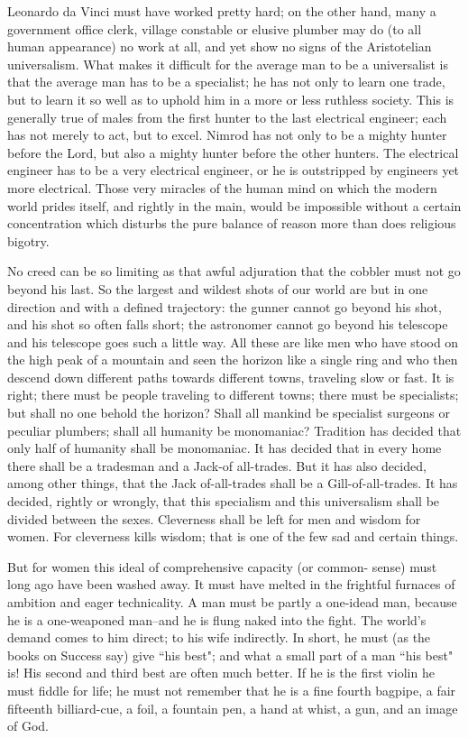 \documentclass[final,10pt,letterpaper,twocolumn,openany]{book}
\begin{document}
Leonardo da Vinci must have worked pretty hard;
on the other hand, many a government office clerk, village constable or
elusive plumber may do (to all human appearance) no work at all, and yet
show no signs of the Aristotelian universalism. What makes it difficult for
the average man to be a universalist is that the average man has to be a
specialist; he has not only to learn one trade, but to learn it so well as to
uphold him in a more or less ruthless society. This is generally true of
males from the first hunter to the last electrical engineer; each has not
merely to act, but to excel. Nimrod has not only to be a mighty hunter
before the Lord, but also a mighty hunter before the other hunters. The
electrical engineer has to be a very electrical engineer, or he is outstripped
by engineers yet more electrical. Those very miracles of the human mind
on which the modern world prides itself, and rightly in the main, would be
impossible without a certain concentration which disturbs the pure balance
of reason more than does religious bigotry.

 No creed can be so limiting as
that awful adjuration that the cobbler must not go beyond his last. So the
largest and wildest shots of our world are but in one direction and with a
defined trajectory: the gunner cannot go beyond his shot, and his shot so
often falls short; the astronomer cannot go beyond his telescope and his
telescope goes such a little way. All these are like men who have stood on
the high peak of a mountain and seen the horizon like a single ring and
who then descend down different paths towards different towns, traveling
slow or fast. It is right; there must be people traveling to different towns;
there must be specialists; but shall no one behold the horizon? Shall all
mankind be specialist surgeons or peculiar plumbers; shall all humanity be
monomaniac? Tradition has decided that only half of humanity shall be
monomaniac. It has decided that in every home there shall be a tradesman
and a Jack-of all-trades. But it has also decided, among other things, that
the Jack of-all-trades shall be a Gill-of-all-trades. It has decided, rightly or
wrongly, that this specialism and this universalism shall be divided
between the sexes. Cleverness shall be left for men and wisdom for
women. For cleverness kills wisdom; that is one of the few sad and certain
things.

But for women this ideal of comprehensive capacity (or common-
sense) must long ago have been washed away. It must have melted in the
frightful furnaces of ambition and eager technicality. A man must be partly
a one-idead man, because he is a one-weaponed man--and he is flung
naked into the fight. The world's demand comes to him direct; to his wife
indirectly. In short, he must (as the books on Success say) give ``his best";
and what a small part of a man ``his best" is! His second and third best are
often much better. If he is the first violin he must fiddle for life; he must
not remember that he is a fine fourth bagpipe, a fair fifteenth billiard-cue,
a foil, a fountain pen, a hand at whist, a gun, and an image of God.
\end{document}
